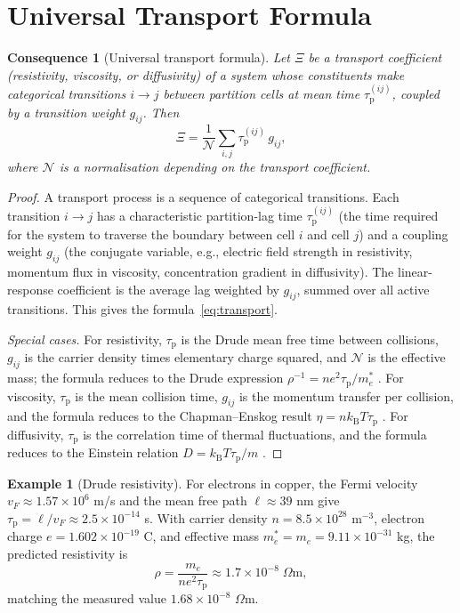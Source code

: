 \documentclass[11pt,twocolumn,a4paper]{article}
\theoremstyle{axiomstyle}
\theoremstyle{conseqstyle}
\newtheorem{consequence}{Consequence}
\theoremstyle{definition}
\newtheorem{example}{Example}
\theoremstyle{remark}
\newcommand{\kB}{k_{\mathrm{B}}}
\newcommand{\taup}{\tau_{\mathrm{p}}}
\begin{document}
\section{Universal Transport Formula}
\label{sec:transport}

\begin{consequence}[Universal transport formula]
\label{cons:transport}
Let $\Xi$ be a transport coefficient (resistivity, viscosity, or diffusivity) of a system whose constituents make categorical transitions $i\to j$ between partition cells at mean time $\taup^{(ij)}$, coupled by a transition weight $g_{ij}$. Then
\begin{equation}
\Xi=\frac{1}{\mathcal{N}}\sum_{i,j}\taup^{(ij)}\,g_{ij},
\label{eq:transport}
\end{equation}
where $\mathcal{N}$ is a normalisation depending on the transport coefficient.
\end{consequence}

\begin{proof}
A transport process is a sequence of categorical transitions. Each transition $i\to j$ has a characteristic partition-lag time $\taup^{(ij)}$ (the time required for the system to traverse the boundary between cell $i$ and cell $j$) and a coupling weight $g_{ij}$ (the conjugate variable, e.g., electric field strength in resistivity, momentum flux in viscosity, concentration gradient in diffusivity). The linear-response coefficient is the average lag weighted by $g_{ij}$, summed over all active transitions. This gives the formula~\eqref{eq:transport}.

\emph{Special cases.} For resistivity, $\taup$ is the Drude mean free time between collisions, $g_{ij}$ is the carrier density times elementary charge squared, and $\mathcal{N}$ is the effective mass; the formula reduces to the Drude expression $\rho^{-1}=ne^{2}\taup/m_{e}^{*}$ \citep{drude1900,ashcroftmermin1976}. For viscosity, $\taup$ is the mean collision time, $g_{ij}$ is the momentum transfer per collision, and the formula reduces to the Chapman--Enskog result $\eta=n\kB T\taup$ \citep{chapman1916}. For diffusivity, $\taup$ is the correlation time of thermal fluctuations, and the formula reduces to the Einstein relation $D=\kB T\taup/m$ \citep{einstein1906}.
\end{proof}

\begin{example}[Drude resistivity]
For electrons in copper, the Fermi velocity $v_{F}\approx 1.57\times 10^{6}$ m/s and the mean free path $\ell\approx 39$ nm give $\taup=\ell/v_{F}\approx 2.5\times 10^{-14}$ s. With carrier density $n=8.5\times 10^{28}$ m$^{-3}$, electron charge $e=1.602\times 10^{-19}$ C, and effective mass $m_{e}^{*}=m_{e}=9.11\times 10^{-31}$ kg, the predicted resistivity is
\begin{equation*}
\rho=\frac{m_{e}}{ne^{2}\taup}\approx 1.7\times 10^{-8}\;\Omega\text{m},
\end{equation*}
matching the measured value $1.68\times 10^{-8}$ $\Omega$m.
\end{example}
\end{document}
